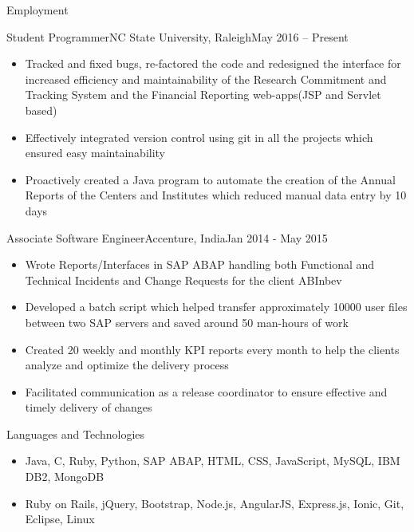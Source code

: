 \documentclass[]{resume}
\begin{document}
	\begin{cvsection}{Employment}
		\begin{cvsubsection}{Student Programmer}{NC State University, Raleigh}{May 2016 – Present}
			\begin{itemize}
            \item Tracked and fixed bugs, re-factored the code and redesigned the interface for increased efficiency and maintainability of the Research Commitment and Tracking System and the Financial Reporting web-apps(JSP and Servlet based)
            \item Effectively integrated version control using git in all the projects which ensured easy maintainability
			\item Proactively created a Java program to automate the creation of the Annual Reports of the Centers and Institutes which reduced manual data entry by 10 days
			\end{itemize}
		\end{cvsubsection}
		
		\begin{cvsubsection}{Associate Software Engineer}{Accenture, India}{Jan 2014 - May 2015}	
			\begin{itemize}
            	\item Wrote Reports/Interfaces in SAP ABAP handling both Functional and Technical Incidents and Change Requests for the client ABInbev
				\item Developed a batch script which helped transfer approximately 10000 user files between two SAP servers and saved around 50 man-hours  of work
				\item Created 20 weekly and monthly KPI reports every month to help the clients analyze and optimize the delivery process
                \item Facilitated communication as a release coordinator to ensure effective and timely delivery of changes
			\end{itemize}
		\end{cvsubsection}

	\end{cvsection}

\begin{cvsection}{Languages and Technologies}
		\begin{cvsubsection}{}{}{}	
			\begin{itemize}
				\item Java, C, Ruby, Python, SAP ABAP, HTML, CSS, JavaScript, MySQL, IBM DB2, MongoDB
				\item Ruby on Rails, jQuery, Bootstrap, Node.js, AngularJS, Express.js, Ionic, Git, Eclipse, Linux
			\end{itemize}
		\end{cvsubsection}
	\end{cvsection}
	
\end{document}
